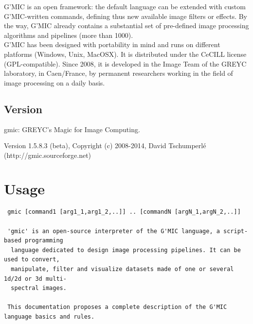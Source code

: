 \documentclass[a4paper,11pt,twoside]{book}
\begin{document}
G'MIC is an open framework: the default language can be extended with custom G'MIC-written commands, defining thus new available image filters or effects. By the way, G'MIC already contains a substantial set of pre-defined image processing algorithms and pipelines (more than 1000).\\ 
 
G'MIC has been designed with portability in mind and runs on different platforms (Windows, Unix, MacOSX). It is distributed under the CeCILL license (GPL-compatible). Since 2008, it is developed in the Image Team of the GREYC laboratory, in Caen/France, by permanent researchers working in the field of image processing on a daily basis. 
\section*{Version} 
 
 gmic: GREYC's Magic for Image Computing. 
 
        Version 1.5.8.3 (beta), Copyright (c) 2008-2014, David Tschumperl\'e 
        (http://gmic.sourceforge.net) 
\chapter{Usage} 
\small
\begin{lstlisting}
 gmic [command1 [arg1_1,arg1_2,..]] .. [commandN [argN_1,argN_2,..]] 
 
 'gmic' is an open-source interpreter of the G'MIC language, a script-based programming 
  language dedicated to design image processing pipelines. It can be used to convert, 
  manipulate, filter and visualize datasets made of one or several 1d/2d or 3d multi- 
  spectral images. 
 
 This documentation proposes a complete description of the G'MIC language basics and rules.
\end{lstlisting}
\normalsize
\end{document}
